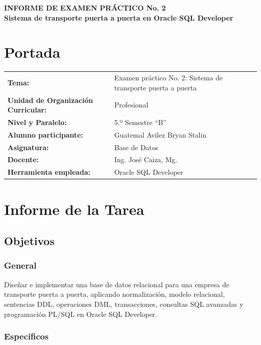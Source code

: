\documentclass{article}
\begin{document}
\begin{center}
    {\large \textbf{INFORME DE EXAMEN PRÁCTICO No. 2}} \\[0.2cm]
    {\normalsize \textbf{Sistema de transporte puerta a puerta en Oracle SQL Developer}}
\end{center}

\section{Portada}

\begin{flushleft}
\begin{tabular}{ l l }
    \textbf{Tema:} & Examen práctico No. 2: Sistema de transporte puerta a puerta \\
    \textbf{Unidad de Organización Curricular:} & Profesional \\
    \textbf{Nivel y Paralelo:} & 5.º Semestre ``B'' \\
    \textbf{Alumno participante:} & Guatemal Avilez Bryan Stalin \\
    \textbf{Asignatura:} & Base de Datos \\
    \textbf{Docente:} & Ing. José Caiza, Mg. \\
    \textbf{Herramienta empleada:} & Oracle SQL Developer \\
\end{tabular}
\end{flushleft}

\section{Informe de la Tarea}

\subsection{Objetivos}

\subsubsection{General}

Diseñar e implementar una base de datos relacional para una empresa de transporte puerta a puerta, aplicando normalización, modelo relacional, sentencias DDL, operaciones DML, transacciones, consultas SQL avanzadas y programación PL/SQL en Oracle SQL Developer.

\subsubsection{Específicos}
\end{document}
